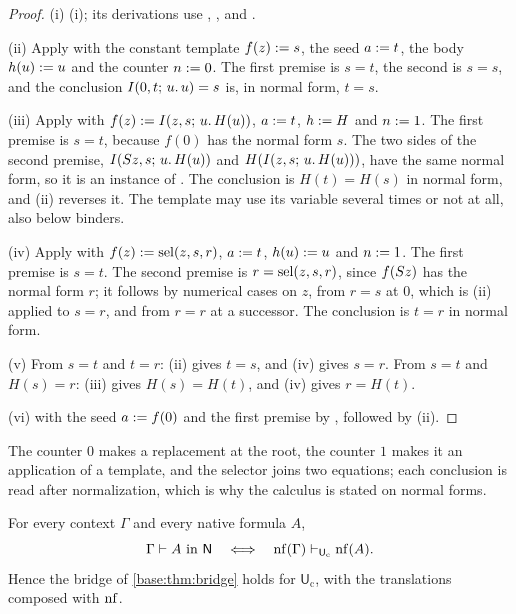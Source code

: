 \begin{proof}
(i) (i); its derivations use ,
,  and .

(ii) Apply  with the constant template $f(z)\mathrel{:=} s$, the
seed $a\mathrel{:=} t$, the body $h(u)\mathrel{:=} u$ and the counter $n\mathrel{:=} 0$.  The
first premise is $s=t$, the second is $s=s$, and the conclusion
$I(0,t;\,u.\,u)=s$ is, in normal form, $t=s$.

(iii) Apply  with $f(z)\mathrel{:=}I(z,s;\,u.\,H(u))$,
$a\mathrel{:=} t$, $h\mathrel{:=} H$ and $n\mathrel{:=} 1$.  The first premise is $s=t$,
because $f(0)$ has the normal form $s$.  The two sides of the second
premise, $I(S z,s;\,u.\,H(u))$ and $H(I(z,s;\,u.\,H(u)))$, have the
same normal form, so it is an instance of .  The conclusion is
$H(t)=H(s)$ in normal form, and (ii) reverses it.  The template may use its
variable several times or not at all, also below binders.

(iv) Apply  with $f(z)\mathrel{:=}\operatorname{sel}(z,s,r)$, $a\mathrel{:=} t$,
$h(u)\mathrel{:=} u$ and $n\mathrel{:=} 1$.  The first premise is $s=t$.  The second
premise is $r=\operatorname{sel}(z,s,r)$, since $f(S z)$ has the normal form $r$; it
follows by numerical cases on $z$, from $r=s$ at $0$, which is (ii) applied
to $s=r$, and from $r=r$ at a successor.  The conclusion is $t=r$ in normal
form.

(v) From $s=t$ and $t=r$: (ii) gives $t=s$, and (iv) gives $s=r$.  From
$s=t$ and $H(s)=r$: (iii) gives $H(s)=H(t)$, and (iv) gives $r=H(t)$.

(vi)  with the seed $a\mathrel{:=} f(0)$ and the first premise by
, followed by (ii).
\end{proof}

The counter $0$ makes  a replacement at the root, the counter
$1$ makes it an application of a template, and the selector joins two
equations; each conclusion is read after normalization, which is why the
calculus is stated on normal forms.

\begin{theorem}
\label{kern:thm:crossed}
For every context $\Gamma$ and every native formula $A$,
\[
 \Gamma\vdash A\ \text{in }\mathsf{N}
 \quad\Longleftrightarrow\quad
 \operatorname{nf}(\Gamma)\vdash_{\mathsf{U}_{\mathrm{c}}}\operatorname{nf}(A).
\]
Hence the bridge of \cref{base:thm:bridge} holds for
$\mathsf{U}_{\mathrm{c}}$, with the translations composed with $\operatorname{nf}$.
\end{theorem}

